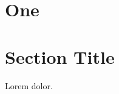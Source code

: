 \documentclass{article}
\begin{document}
\section{One}
\beginnumbering
\pstart
	\lipsum[1]
\pend
\endnumbering

\section{Section Title}

\begin{pairs}  
\begin{Leftside} 
    \beginnumbering  
    \pstart  
	\lipsum[1]
    \pend  
    \pausenumbering
\end{Leftside} 
\begin{Rightside}   
    \beginnumbering  
    \pstart  
        \lipsum[2]
    \pend  
    \pausenumbering
\end{Rightside}  
\end{pairs}  
\Columns

\resumenumbering
\pstart  
    Lorem  dolor.
\pend  
\pausenumbering
\end{document}
